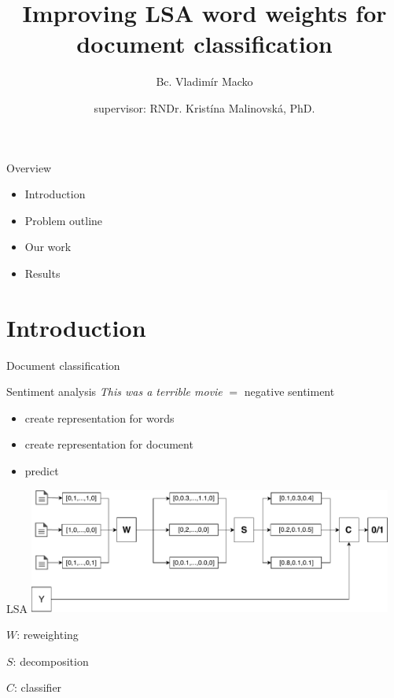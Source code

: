 \documentclass[xcolor={table}]{beamer}
\title[eLSA]{Improving LSA word weights for document classification}
\author[Macko, Malinovska] %
{Bc. Vladimír Macko\inst{1} \\ \and {\small supervisor: RNDr. Kristína Malinovská, PhD.\inst{1}}}
\institute[VFU] %
{
  \inst{1}%
  Comenius University\\
  Faculty of Mathematics, Physics and Informatics
}
\begin{document}
        
\begin{frame}
    \titlepage
\end{frame}
    
\begin{frame}{Overview}
    \begin{block}{}
        \begin{itemize}
            \item Introduction
            \item Problem outline
            \item Our work
            \item Results
        \end{itemize}
    \end{block}
\end{frame}

\section{Introduction}
\begin{frame}{Document classification}
    \begin{block}{Sentiment analysis}
        \emph{This was a terrible movie} $=$ negative sentiment
    \end{block}
    
    \begin{block}{}   
        \begin{itemize}
            \item create representation for words
            \item create representation for document
            \item predict
        \end{itemize}
    \end{block}
\end{frame} 

\begin{frame}{LSA}
    \includegraphics[width=0.9\textwidth]{LSA.pdf}
    \begin{block}
        
        $W$: reweighting

        $S$: decomposition
        
        $C$: classifier
    \end{block}
\end{frame}
\end{document}
